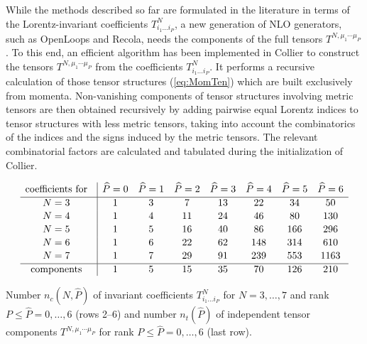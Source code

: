 \documentclass[preprint,sort&compress,12pt]{elsarticle}
\renewcommand{\Green}{\textcolor{mygreen}}
\newcommand{\collier}{{\sc Collier}}
\begin{document}
While the methods described so far are formulated in the literature in
terms of the Lorentz-invariant coefficients $T^N_{i_1\ldots i_P}$, a
new generation of NLO generators, such as {\sc OpenLoops} and {\sc
  Recola}, needs the components of the full tensors
$T^{N,\mu_1\cdots\mu_{P}}$. To this end, an efficient algorithm has
been implemented in {\collier} to construct the tensors
$T^{N,\mu_1\cdots\mu_{P}}$ from the coefficients $T^N_{i_1\ldots
  i_P}$. It performs a recursive calculation of those tensor
structures (\ref{eq:MomTen}) which
are built exclusively from momenta.
Non-vanishing components of tensor structures involving metric
tensors are then obtained recursively by adding pairwise equal Lorentz
indices to tensor structures with less metric tensors,
taking into account the combinatorics of the indices and the signs
induced by the metric tensors.
The relevant combinatorial
factors are calculated and tabulated during the initialization of
{\collier}.
\begin{table}[t]
\let\Green\relax
\let\Red\relax
\let\Blue\relax
\small
  $$\begin{array}{c@{\quad}|c@{\quad}c@{\quad}c@{\quad}c@{\quad}c@{\quad}c@{\quad}c}
{\rm coefficients~for}
             &  \Blue{\widehat{P}=0}  & \Blue{\widehat{P}=1}  & \Blue{\widehat{P}=2} & 
                \Blue{\widehat{P}=3} & \Blue{\widehat{P}=4} & \Blue{\widehat{P}=5} & 
                \Blue{\widehat{P}=6}\\[.3ex]\hline
\Green{N=3}          &  1    &  3   &  7   & 13  & 22  &  34  &   50\\[.3ex]
\Green{N=4}          &  1    &  4   &  11  & 24  & 46  &  80  &  130\\[.3ex]
\Green{N=5}          &  1    &  5   &  16  & 40  & 86  & 166  &  296\\[.3ex]
\Green{N=6}          &  1    &  6   &  22  & 62  & 148 & 314  &  610\\[.3ex]
\Green{N=7}          &  1    &  7   &  29  & 91  & 239 & 553  & 1163\\[.3ex]\hline
\Red{\rm{components}}    &  1    &  5   &  15  & 35  &  70 & 126  &  210  
\end{array}$$
\caption{Number $n_c(N,\widehat{P})$ of invariant coefficients $T^N_{i_1\ldots i_P}$ for
  $N=3,\ldots,7$ and rank $P\le \widehat{P}=0,\ldots,6$ (rows 2--6) and number $n_t{(\widehat{P})}$ of 
independent tensor components $T^{N,\mu_1\cdots\mu_{P}}$ for rank $P\le \widehat{P}=0,\ldots,6$ (last
  row).}
\label{tab:numbers}
\end{table}
\end{document}
